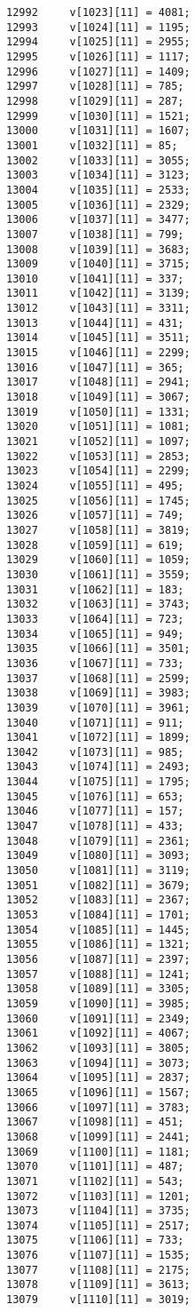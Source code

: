\begin{Code}
\begin{verbatim}
12992     v[1023][11] = 4081;
12993     v[1024][11] = 1195;
12994     v[1025][11] = 2955;
12995     v[1026][11] = 1117;
12996     v[1027][11] = 1409;
12997     v[1028][11] = 785;
12998     v[1029][11] = 287;
12999     v[1030][11] = 1521;
13000     v[1031][11] = 1607;
13001     v[1032][11] = 85;
13002     v[1033][11] = 3055;
13003     v[1034][11] = 3123;
13004     v[1035][11] = 2533;
13005     v[1036][11] = 2329;
13006     v[1037][11] = 3477;
13007     v[1038][11] = 799;
13008     v[1039][11] = 3683;
13009     v[1040][11] = 3715;
13010     v[1041][11] = 337;
13011     v[1042][11] = 3139;
13012     v[1043][11] = 3311;
13013     v[1044][11] = 431;
13014     v[1045][11] = 3511;
13015     v[1046][11] = 2299;
13016     v[1047][11] = 365;
13017     v[1048][11] = 2941;
13018     v[1049][11] = 3067;
13019     v[1050][11] = 1331;
13020     v[1051][11] = 1081;
13021     v[1052][11] = 1097;
13022     v[1053][11] = 2853;
13023     v[1054][11] = 2299;
13024     v[1055][11] = 495;
13025     v[1056][11] = 1745;
13026     v[1057][11] = 749;
13027     v[1058][11] = 3819;
13028     v[1059][11] = 619;
13029     v[1060][11] = 1059;
13030     v[1061][11] = 3559;
13031     v[1062][11] = 183;
13032     v[1063][11] = 3743;
13033     v[1064][11] = 723;
13034     v[1065][11] = 949;
13035     v[1066][11] = 3501;
13036     v[1067][11] = 733;
13037     v[1068][11] = 2599;
13038     v[1069][11] = 3983;
13039     v[1070][11] = 3961;
13040     v[1071][11] = 911;
13041     v[1072][11] = 1899;
13042     v[1073][11] = 985;
13043     v[1074][11] = 2493;
13044     v[1075][11] = 1795;
13045     v[1076][11] = 653;
13046     v[1077][11] = 157;
13047     v[1078][11] = 433;
13048     v[1079][11] = 2361;
13049     v[1080][11] = 3093;
13050     v[1081][11] = 3119;
13051     v[1082][11] = 3679;
13052     v[1083][11] = 2367;
13053     v[1084][11] = 1701;
13054     v[1085][11] = 1445;
13055     v[1086][11] = 1321;
13056     v[1087][11] = 2397;
13057     v[1088][11] = 1241;
13058     v[1089][11] = 3305;
13059     v[1090][11] = 3985;
13060     v[1091][11] = 2349;
13061     v[1092][11] = 4067;
13062     v[1093][11] = 3805;
13063     v[1094][11] = 3073;
13064     v[1095][11] = 2837;
13065     v[1096][11] = 1567;
13066     v[1097][11] = 3783;
13067     v[1098][11] = 451;
13068     v[1099][11] = 2441;
13069     v[1100][11] = 1181;
13070     v[1101][11] = 487;
13071     v[1102][11] = 543;
13072     v[1103][11] = 1201;
13073     v[1104][11] = 3735;
13074     v[1105][11] = 2517;
13075     v[1106][11] = 733;
13076     v[1107][11] = 1535;
13077     v[1108][11] = 2175;
13078     v[1109][11] = 3613;
13079     v[1110][11] = 3019;

\end{verbatim}
\end{Code}
